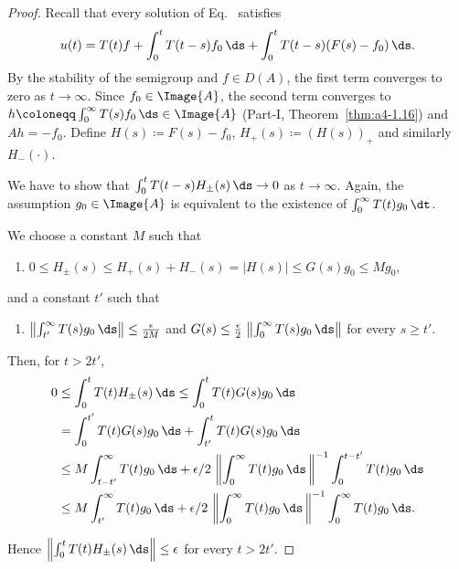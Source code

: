 \begin{proof}
Recall that every solution of Eq.~ satisfies
\begin{equation}\label{eq:c4-1.7}
u(t) = T(t)f + \int_{0}^{t} T(t-s)f_{0} \, \ds + \int_{0}^{t} T(t-s)(F(s) - f_{0}) \, \ds.
\end{equation}
By the stability of the semigroup and $f \in D(A)$, the first term converges to zero as $t \to \infty$.
Since $f_{0} \in \Image{A}$, the second term converges to $h \coloneqq  \int_{0}^{\infty} T(s)f_{0} \, \ds \in \Image{A}$ (Part-I, Theorem~\ref{thm:a4-1.16}) and $Ah = -f_{0}$.
Define $H(s) \coloneqq F(s) - f_{0}$, 
$ H_{+}(s) \coloneqq (H(s))_{+} $ 
and similarly $H_{-}(\cdot)$.

We have to show that $\int_{0}^{t} T(t-s)H_{\pm}(s) \, \ds \to 0$ as $t \to \infty$.
Again, the assumption $g_{0} \in \Image{A}$ is equivalent to the existence of\/ $\int_{0}^{\infty} T(t)g_{0} \, \dt$.

We choose a constant $M$  such that 
\begin{enumerate}[\upshape (i)]
    \item 
    $0 \leq H_{\pm}(s) \leq H_{+}(s) + H_{-}(s) = |H(s)| \leq G(s)g_{0} \leq Mg_{0}$,
\end{enumerate}
and a constant $t'$ such that
\begin{enumerate}
    \item $ \left\|\int_{t'}^{\infty} T(s)g_{0} \, \ds\right\| \leq \frac{\epsilon}{2M}$ and  
$G(s) \leq \frac{\epsilon}{2} \,  \left\|\int_{0}^{\infty} T(s)g_{0} \, \ds\right\|$ for every $s \geq t'$.
\end{enumerate}
Then, for $t > 2t'$,
\begin{align*}
0 &\leq \int_{0}^{t} T(t)H_{\pm}(s) \, \ds \leq \int_{0}^{t} T(t)G(s)g_{0} \, \ds\\
&= \int_{0}^{t'} T(t)G(s)g_{0} \, \ds + \int_{t'}^{t} T(t)G(s)g_{0} \, \ds\\
&\leq M \int_{t-t'}^{\infty} T(t)g_{0} \, \ds + \epsilon/2 \,  \left\|\int_{0}^{\infty} T(t)g_{0} \, \ds\, \right\|^{-1} \int_{0}^{t-t'} T(t)g_{0} \, \ds\\
&\leq M \int_{t'}^{\infty} T(t)g_{0} \, \ds + \epsilon/2 \,  \left\|\int_{0}^{\infty} T(t)g_{0} \, \ds\, \right\|^{-1} \int_{0}^{\infty} T(t)g_{0} \, \ds.
\end{align*}

Hence $\left\|\int_{0}^{t} T(t)H_{\pm}(s) \, \ds\right\| \leq \epsilon$ for every $t > 2t'$.
\end{proof}
